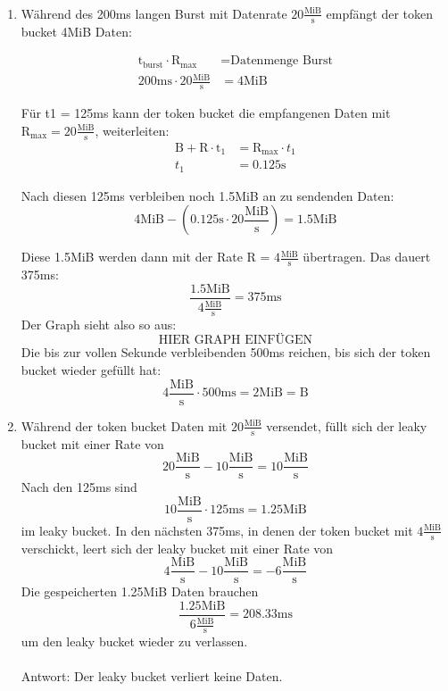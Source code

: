 \documentclass[a4paper,
			llpt,
			solution,
			accentcolor=tud2d,
			colorbacktitle
			]
			{tudexercise}
\newcommand{\MiBs}{\frac{\mathrm{MiB}}{\mathrm{s}}}
\begin{document}
\subsubsection{}
\begin{enumerate}

\item
Während des 200ms langen Burst mit Datenrate $20\MiBs$ empfängt der token bucket 4MiB Daten:

\begin{align*}
\text{t}_\text{burst}  \cdot \text{R}_\text{max} &= \text{Datenmenge Burst}
\\
200\mathrm{ms} \cdot 20\MiBs &= \mathrm{4MiB}
\end{align*}


Für t1 = 125ms kann der token bucket die empfangenen Daten mit $\mathrm{R}_{\mathrm{max}} = 20\MiBs$, weiterleiten:
\begin{align*}
\mathrm{B} + \mathrm{R}\cdot\mathrm{t}_1 &= \mathrm{R}_ {\mathrm{max}} \cdot t_1
\\
t_1 &= 0.125\mathrm{s}
\end{align*}

Nach diesen 125ms verbleiben noch 1.5MiB an zu sendenden Daten:
$$4\mathrm{MiB} - \left(0.125\mathrm{s} \cdot 20\MiBs\right) = 1.5 \mathrm{MiB}$$

Diese 1.5MiB werden dann mit der Rate R = $4\MiBs
$
übertragen. Das dauert 375ms:
$$
\frac{1.5 \mathrm{MiB}}{ 4 \MiBs} = 375\mathrm{ms}
$$
Der Graph sieht also so aus:
$$\text{HIER GRAPH EINFÜGEN}$$
Die bis zur vollen Sekunde verbleibenden 500ms reichen, bis sich der token bucket wieder gefüllt hat:
$$
4\MiBs \cdot 500\mathrm{ms} = 2\mathrm{MiB} = \mathrm{B}
$$

\item
Während der token bucket Daten mit $20\MiBs$ versendet, füllt sich der leaky bucket mit einer Rate von
$$
20 \MiBs - 10\MiBs = 10\MiBs
$$
Nach den 125ms sind
$$
10\MiBs  \cdot 125\mathrm{ms} = 1.25 \mathrm{MiB}
$$ im leaky bucket.
In den nächsten 375ms, in denen der token bucket mit $4\MiBs$ verschickt, leert sich der leaky bucket mit einer Rate von
$$
4\MiBs - 10\MiBs = -6 \MiBs
$$
Die gespeicherten 1.25MiB Daten brauchen
$$
\frac{1.25\mathrm{MiB}}{6\MiBs} = 208.33\mathrm{ms}
$$
um den leaky bucket wieder zu verlassen.
\\\\
Antwort: Der leaky bucket verliert keine Daten.
\end{enumerate}


\subsubsection{}



\subsubsection{}


\subsection{}
\end{document}
